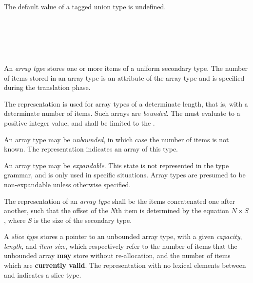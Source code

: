 
\specsubsubitem
The default value of a tagged union type is undefined.


\begin{grammar}
 \\
	\terminal{[} \terminal{]}  \\
	\terminal{[}  \terminal{]}  \\
	\terminal{[} \terminal{*} \terminal{]}  \\
\end{grammar}

\specsubsubitem
An \textit{array type} stores one or more items of a uniform secondary type.
The number of items stored in an array type is an attribute of the array type
and is specified during the translation phase.

\specsubsubitem
The  representation is used for array types of a
determinate length, that is, with a determinate number of items. Such arrays are
\textit{bounded}. The  must evaluate to a
positive integer value, and shall be limited to the .

\specsubsubitem
An array type may be \textit{unbounded}, in which case the number of items is
not known. The \terminal{*} representation indicates an array of this type.

\specsubsubitem
An array type may be \textit{expandable}. This state is not represented in the
type grammar, and is only used in specific situations. Array types are presumed
to be non-expandable unless otherwise specified.

\specsubsubitem
The representation of an \textit{array type} shall be the items concatenated one
after another, such that the offset of the \textit{N}th item is determined by
the equation $N \times S$, where \textit{S} is the size of the secondary type.

\specsubsubitem
A \textit{slice type} stores a pointer to an unbounded array type, with a given
\textit{capacity}, \textit{length}, and \textit{item size}, which respectively
refer to the number of items that the unbounded array \textbf{may} store without
re-allocation, and the number of items which are \textbf{currently valid}. The
representation with no lexical elements between \terminal{[} and \terminal{]}
indicates a slice type.

